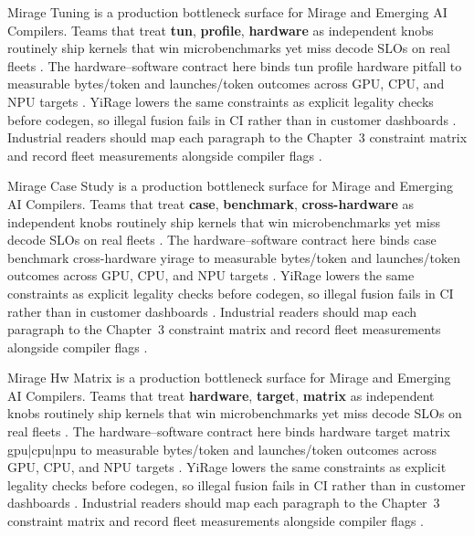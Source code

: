 Mirage Tuning is a production bottleneck surface for Mirage and Emerging AI Compilers. Teams that treat \textbf{tun}, \textbf{profile}, \textbf{hardware} as independent knobs routinely ship kernels that win microbenchmarks yet miss decode SLOs on real fleets \citep{dlbook,nvidia2024cudagraphs}. The hardware--software contract here binds tun profile hardware pitfall to measurable bytes/token and launches/token outcomes across GPU, CPU, and NPU targets \citep{dao2022flashattention,liu2024deepseekv3}. YiRage lowers the same constraints as explicit legality checks before codegen, so illegal fusion fails in CI rather than in customer dashboards \citep{kwon2023vllm,patel2025llminference}. Industrial readers should map each paragraph to the Chapter~3 constraint matrix and record fleet measurements alongside compiler flags \citep{nvidia2024cudagraphs,taxbreak2026}.

Mirage Case Study is a production bottleneck surface for Mirage and Emerging AI Compilers. Teams that treat \textbf{case}, \textbf{benchmark}, \textbf{cross-hardware} as independent knobs routinely ship kernels that win microbenchmarks yet miss decode SLOs on real fleets \citep{dao2022flashattention,liu2024deepseekv3}. The hardware--software contract here binds case benchmark cross-hardware yirage to measurable bytes/token and launches/token outcomes across GPU, CPU, and NPU targets \citep{kwon2023vllm,patel2025llminference}. YiRage lowers the same constraints as explicit legality checks before codegen, so illegal fusion fails in CI rather than in customer dashboards \citep{nvidia2024cudagraphs,taxbreak2026}. Industrial readers should map each paragraph to the Chapter~3 constraint matrix and record fleet measurements alongside compiler flags \citep{liu2024deepseekv3,memoryfloor2026}.

Mirage Hw Matrix is a production bottleneck surface for Mirage and Emerging AI Compilers. Teams that treat \textbf{hardware}, \textbf{target}, \textbf{matrix} as independent knobs routinely ship kernels that win microbenchmarks yet miss decode SLOs on real fleets \citep{kwon2023vllm,patel2025llminference}. The hardware--software contract here binds hardware target matrix gpu|cpu|npu to measurable bytes/token and launches/token outcomes across GPU, CPU, and NPU targets \citep{nvidia2024cudagraphs,taxbreak2026}. YiRage lowers the same constraints as explicit legality checks before codegen, so illegal fusion fails in CI rather than in customer dashboards \citep{liu2024deepseekv3,memoryfloor2026}. Industrial readers should map each paragraph to the Chapter~3 constraint matrix and record fleet measurements alongside compiler flags \citep{patel2025llminference,nvidia2022hopper}.

